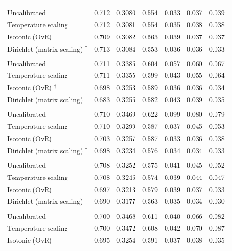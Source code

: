 \begin{table}[!htbp]
\begin{tabular*}{\textwidth}{@{\extracolsep\fill}@{}lcccccc@{}}
\addlinespace[2pt]
\multicolumn{7}{@{}l}{\textit{Stacking}} \\
Uncalibrated & 0.712 & 0.3080 & 0.554 & 0.033 & 0.037 & 0.039 \\
Temperature scaling & 0.712 & 0.3081 & 0.554 & 0.035 & 0.038 & 0.038 \\
Isotonic (OvR) & 0.709 & 0.3082 & 0.563 & 0.039 & 0.037 & 0.037 \\
Dirichlet (matrix scaling) $^{\dagger}$ & 0.713 & 0.3084 & 0.553 & 0.036 & 0.036 & 0.033 \\
\addlinespace[2pt]
\multicolumn{7}{@{}l}{\textit{Extra trees}} \\
Uncalibrated & 0.711 & 0.3385 & 0.604 & 0.057 & 0.060 & 0.067 \\
Temperature scaling & 0.711 & 0.3355 & 0.599 & 0.043 & 0.055 & 0.064 \\
Isotonic (OvR) $^{\dagger}$ & 0.698 & 0.3253 & 0.589 & 0.036 & 0.036 & 0.034 \\
Dirichlet (matrix scaling) & 0.683 & 0.3255 & 0.582 & 0.043 & 0.039 & 0.035 \\
\addlinespace[2pt]
\multicolumn{7}{@{}l}{\textit{Random forest}} \\
Uncalibrated & 0.710 & 0.3469 & 0.622 & 0.099 & 0.080 & 0.079 \\
Temperature scaling & 0.710 & 0.3299 & 0.587 & 0.037 & 0.045 & 0.053 \\
Isotonic (OvR) & 0.703 & 0.3257 & 0.587 & 0.033 & 0.036 & 0.038 \\
Dirichlet (matrix scaling) $^{\dagger}$ & 0.698 & 0.3234 & 0.576 & 0.034 & 0.034 & 0.033 \\
\addlinespace[2pt]
\multicolumn{7}{@{}l}{\textit{CatBoost}} \\
Uncalibrated & 0.708 & 0.3252 & 0.575 & 0.041 & 0.045 & 0.052 \\
Temperature scaling & 0.708 & 0.3245 & 0.574 & 0.039 & 0.044 & 0.047 \\
Isotonic (OvR) & 0.697 & 0.3213 & 0.579 & 0.039 & 0.037 & 0.033 \\
Dirichlet (matrix scaling) $^{\dagger}$ & 0.690 & 0.3177 & 0.563 & 0.035 & 0.034 & 0.030 \\
\addlinespace[2pt]
\multicolumn{7}{@{}l}{\textit{Logistic regression}} \\
Uncalibrated & 0.700 & 0.3468 & 0.611 & 0.040 & 0.066 & 0.082 \\
Temperature scaling & 0.700 & 0.3472 & 0.608 & 0.042 & 0.070 & 0.087 \\
Isotonic (OvR) & 0.695 & 0.3254 & 0.591 & 0.037 & 0.038 & 0.035 \\

\end{tabular*}
\end{table}
